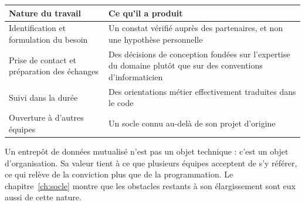 \begin{center}
\begin{tabularx}{\textwidth}{@{}lX@{}}
\toprule
\textbf{Nature du travail} & \textbf{Ce qu'il a produit} \\
\midrule
Identification et formulation du besoin & Un constat vérifié auprès des partenaires, et non une
hypothèse personnelle \\
Prise de contact et préparation des échanges & Des décisions de conception fondées sur
l'expertise du domaine plutôt que sur des conventions d'informaticien \\
Suivi dans la durée & Des orientations métier effectivement traduites dans le code \\
Ouverture à d'autres équipes & Un socle connu au-delà de son projet d'origine \\
\bottomrule
\end{tabularx}
\end{center}

Un entrepôt de données mutualisé n'est pas un objet technique : c'est un objet d'organisation.
Sa valeur tient à ce que plusieurs équipes acceptent de s'y référer, ce qui relève de la
conviction plus que de la programmation. Le chapitre~\ref{ch:socle} montre que les obstacles
restants à son élargissement sont eux aussi de cette nature.
